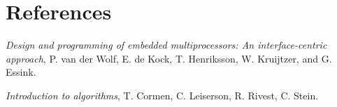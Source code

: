 \section{References} %
\label{sec:references}

\begin{thebibliography}{1}

	\emph{Design and programming of embedded multiprocessors: An interface-centric approach},
  	P. van der Wolf, E. de Kock, T. Henriksson, W. Kruijtzer, and G. Essink.

	\emph{Introduction to algorithms},
	T. Cormen, C. Leiserson, R. Rivest, C. Stein.

\end{thebibliography}